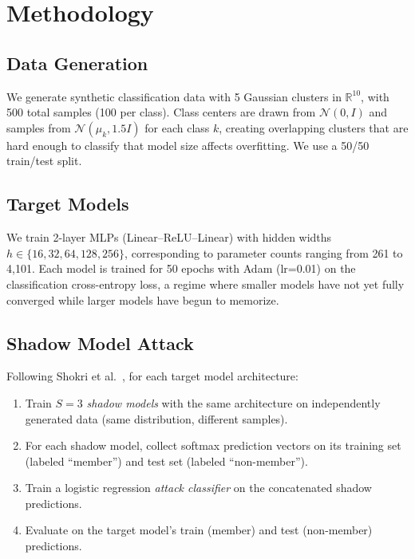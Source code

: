 \documentclass[11pt,a4paper]{article}
\begin{document}
\section{Methodology}

\subsection{Data Generation}

We generate synthetic classification data with 5 Gaussian clusters in
$\mathbb{R}^{10}$, with 500 total samples (100 per class). Class centers
are drawn from $\mathcal{N}(0, I)$ and samples from
$\mathcal{N}(\mu_k, 1.5I)$ for each class $k$, creating overlapping
clusters that are hard enough to classify that model size affects
overfitting. We use a 50/50 train/test split.

\subsection{Target Models}

We train 2-layer MLPs (Linear--ReLU--Linear) with hidden widths
$h \in \{16, 32, 64, 128, 256\}$, corresponding to parameter counts
ranging from 261 to 4,101. Each model is trained for 50 epochs with
Adam (lr=0.01) on the classification cross-entropy loss, a regime
where smaller models have not yet fully converged while larger models
have begun to memorize.

\subsection{Shadow Model Attack}

Following Shokri et al.~\citep{shokri2017membership}, for each target
model architecture:
\begin{enumerate}
  \item Train $S=3$ \emph{shadow models} with the same architecture on
    independently generated data (same distribution, different samples).
  \item For each shadow model, collect softmax prediction vectors on its
    training set (labeled ``member'') and test set (labeled ``non-member'').
  \item Train a logistic regression \emph{attack classifier} on the
    concatenated shadow predictions.
  \item Evaluate on the target model's train (member) and test
    (non-member) predictions.
\end{enumerate}
\end{document}
